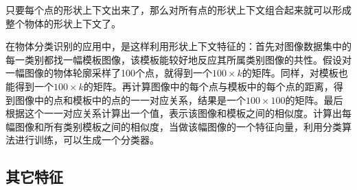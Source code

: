 \begin{enumerate}
只要每个点的形状上下文出来了，那么对所有点的形状上下文组合起来就可以形成整个物体的形状上下文了。

在物体分类识别的应用中，是这样利用形状上下文特征的：首先对图像数据集中的每一类别都找一幅模板图像，该模板能较好地反应其所属类别图像的共性。假设对一幅图像的物体轮廓采样了100个点，就得到一个$100\times k$的矩阵。同样，对模板也能得到一个$100\times k$的矩阵。再计算图像中的每个点与模板中的每个点的距离，得到图像中的点和模板中的点的一一对应关系，结果是一个$100\times100$的矩阵。最后根据这个一一对应关系计算出一个值，表示该图像和模板之间的相似度。计算出每幅图像和所有类别模板之间的相似度，当做该幅图像的一个特征向量，利用分类算法进行训练，可以生成一个分类器。
\end{enumerate}

\subsection{其它特征}

